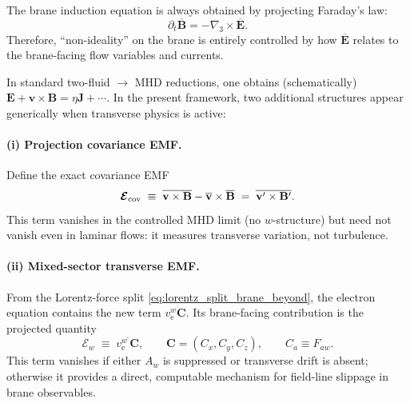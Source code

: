 \documentclass[11pt]{article}
\newcommand{\ele}{\mathrm{e}}
\begin{document}
The brane induction equation is always obtained by projecting Faraday's law:
\begin{equation}
\partial_t \overline{\mathbf{B}} = -\nabla_3\times \overline{\mathbf{E}}.
\label{eq:proj_faraday_beyond}
\end{equation}
Therefore, ``non-ideality'' on the brane is entirely controlled by how \(\overline{\mathbf{E}}\)
relates to the brane-facing flow variables and currents.

In standard two-fluid \(\to\) MHD reductions, one obtains (schematically)
\(\mathbf{E}+\mathbf{v}\times\mathbf{B}=\eta\mathbf{J}+\cdots\). In the present framework,
two additional structures appear generically when transverse physics is active:

\paragraph{(i) Projection covariance EMF.}
Define the exact covariance EMF
\begin{equation}
\boldsymbol{\mathcal{E}}_{\rm cov}
\;\equiv\;
\overline{\mathbf{v}\times\mathbf{B}}-\overline{\mathbf{v}}\times\overline{\mathbf{B}}
\;=\;
\overline{\mathbf{v}'\times\mathbf{B}'}.
\label{eq:Ecov_def_beyond}
\end{equation}
This term vanishes in the controlled MHD limit (no \(w\)-structure) but need not vanish
even in laminar flows: it measures transverse variation, not turbulence.

\paragraph{(ii) Mixed-sector transverse EMF.}
From the Lorentz-force split \eqref{eq:lorentz_split_brane_beyond}, the electron equation
contains the new term \(v_\ele^w \mathbf{C}\). Its brane-facing contribution is the projected
quantity
\begin{equation}
\boldsymbol{\mathcal{E}}_{w}
\;\equiv\;
\overline{v_\ele^w\,\mathbf{C}},
\qquad \mathbf{C}=(C_x,C_y,C_z),\qquad C_a\equiv F_{aw}.
\label{eq:Ew_def_beyond2}
\end{equation}
This term vanishes if either \(A_w\) is suppressed or transverse drift is absent; otherwise it
provides a direct, computable mechanism for field-line slippage in brane observables.
\end{document}

